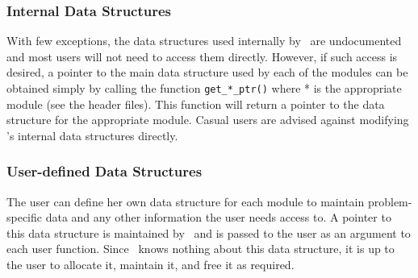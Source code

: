 \subsubsection{Internal Data Structures}

With few exceptions, the data structures used internally by \BB\
are undocumented and most users will not need to access them
directly. However, if such access is desired, a pointer to the main data
structure used by each of the modules can be obtained simply by calling
the function {\tt get\_*\_ptr()} where * is the appropriate module (see the
header files). This function will return a pointer to the data
structure for the appropriate module. Casual users are advised against
modifying \BB's internal data structures directly.

\subsubsection{User-defined Data Structures}

The user can define her own data structure for each module to maintain
problem-specific data and any other information the user needs access
to. A pointer to this data structure is maintained by \BB\ and is
passed to the user as an argument to each user function. Since
\BB\ knows nothing about this data structure, it is up to the user
to allocate it, maintain it, and free it as required.

